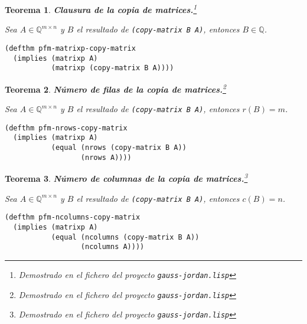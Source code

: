 \documentclass[a4paper,10pt]{article}
\newcommand{\Q}[1]{#1 \in \mathbb{Q}}
\newcommand{\M}[3]{#1 \in \mathbb{Q}^{#2 \times #3}}
\newtheorem{teor}{{Teorema}}
\begin{document}
\par \vspace{16pt}

\begin{teor} \textbf{Clausura de la copia de matrices.}\footnote{Demostrado en el fichero del proyecto \texttt{gauss-jordan.lisp}}\vspace{8pt}\par
Sea $\M{A}{m}{n}$ y $B$ el resultado de \texttt{(copy-matrix B A)}, entonces $\Q{B}$.
\end{teor}

\begin{lstlisting}[language=clips]
(defthm pfm-matrixp-copy-matrix
  (implies (matrixp A)
           (matrixp (copy-matrix B A))))
\end{lstlisting}

\par \vspace{16pt}

\begin{teor} \textbf{Número de filas de la copia de matrices.}\footnote{Demostrado en el fichero del proyecto \texttt{gauss-jordan.lisp}}\vspace{8pt}\par
Sea $\M{A}{m}{n}$ y $B$ el resultado de \texttt{(copy-matrix B A)}, entonces $r(B) = m$.
\end{teor}

\begin{lstlisting}[language=clips]
(defthm pfm-nrows-copy-matrix
  (implies (matrixp A)
           (equal (nrows (copy-matrix B A))
                  (nrows A))))
\end{lstlisting}

\par \vspace{16pt}

\begin{teor} \textbf{Número de columnas de la copia de matrices.}\footnote{Demostrado en el fichero del proyecto \texttt{gauss-jordan.lisp}}\vspace{8pt}\par
Sea $\M{A}{m}{n}$ y $B$ el resultado de \texttt{(copy-matrix B A)}, entonces $c(B) = n$.
\end{teor}

\begin{lstlisting}[language=clips]
(defthm pfm-ncolumns-copy-matrix
  (implies (matrixp A)
           (equal (ncolumns (copy-matrix B A))
                  (ncolumns A))))
\end{lstlisting}
\end{document}
